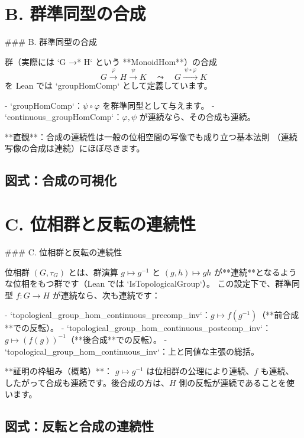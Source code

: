 \documentclass[11pt]{article}
\theoremstyle{definition}
\begin{document}
\section*{B. 群準同型の合成}
### B. 群準同型の合成

群（実際には `G →* H` という **MonoidHom**）の合成
$$
G \xrightarrow{\ \varphi\ } H \xrightarrow{\ \psi\ } K
\quad\leadsto\quad
G \xrightarrow{\ \psi\circ\varphi\ } K
$$
を Lean では `groupHomComp` として定義しています。

- `groupHomComp`：$\psi\circ\varphi$ を群準同型として与えます。
- `continuous_groupHomComp`：$\varphi,\psi$ が連続なら、その合成も連続。

**直観**：合成の連続性は一般の位相空間の写像でも成り立つ基本法則
（連続写像の合成は連続）にほぼ尽きます。

\subsection*{図式：合成の可視化}



\section*{C. 位相群と反転の連続性}
### C. 位相群と反転の連続性

位相群 $(G,\tau_G)$ とは、群演算 $g\mapsto g^{-1}$ と $(g,h)\mapsto gh$
が**連続**となるような位相をもつ群です（Lean では `IsTopologicalGroup`）。
この設定下で、群準同型 $f:G\to H$ が連続なら、次も連続です：

- `topological_group_hom_continuous_precomp_inv`：$g\mapsto f(g^{-1})$（**前合成**での反転）。
- `topological_group_hom_continuous_postcomp_inv`：$g\mapsto (f(g))^{-1}$（**後合成**での反転）。
- `topological_group_hom_continuous_inv`：上と同値な主張の総括。

**証明の枠組み（概略）**：
$g\mapsto g^{-1}$ は位相群の公理により連続、$f$ も連続、
したがって合成も連続です。後合成の方は、$H$ 側の反転が連続であることを使います。

\subsection*{図式：反転と合成の連続性}

\quad
{}
\end{document}
